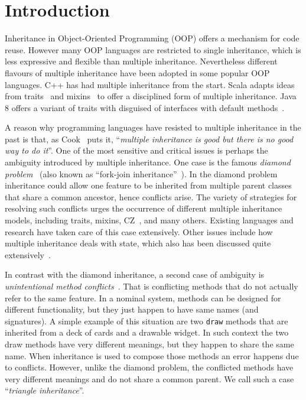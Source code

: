 \section{Introduction}
Inheritance in Object-Oriented Programming (OOP) offers a mechanism
for code reuse. However many OOP languages are restricted to single
inheritance, which is less expressive and flexible than multiple
inheritance. Nevertheless different flavours of multiple inheritance
have been adopted in some popular OOP languages. C++ has had 
multiple inheritance from the start. Scala adapts ideas from traits~\cite{scharli03traits} 
and mixins~\cite{bracha90mixin} to offer a disciplined form of multiple inheritance. Java 8 
offers a variant of traits with disguised of interfaces with default methods~\cite{goetz12fdefenders}.

A reason why programming languages have resisted to multiple
inheritance in the past is that, as Cook~\cite{Cook1987} puts it, 
``\emph{multiple inheritance is good but there is no good way to do it}''.
One of the most sensitive and critical issues is perhaps the ambiguity
introduced by multiple inheritance. One case is the famous
\textit{diamond problem}~\cite{Sak89dis,Singh1995} (also known as ``fork-join inheritance''~\cite{Sak89dis}). In the diamond problem inheritance could allow
one feature to be inherited from multiple parent classes that share a
common ancestor, hence
conflicts arise. The variety of strategies for resolving such conflicts
urges the occurrence of different multiple inheritance models,
including traits, mixins, CZ~\cite{malayeri2009cz}, and many others. Existing
languages and research have taken care of this case extensively. Other issues
include how multiple inheritance deals with state, 
which also has been discussed quite extensively~\cite{classless,malayeri2009cz,stroustrup1995}.

In contrast with the diamond inheritance, a second case of ambiguity
is \textit{unintentional method conflicts}~\cite{scharli03traits}. That is conflicting 
methods that do not actually refer to the same feature. 
In a nominal system, methods can be designed for different
functionality, but they just happen to have same names (and
signatures).
A simple example of this situation are two \lstinline{draw} methods that
are inherited from a deck of cards and a drawable widget. 
In such context the two draw methods have very different meanings, 
but they happen to share the same name.
When inheritance is used to compose those methods an
error happens due to conflicts. However, unlike the diamond problem,
the conflicted methods have very different meanings and do not share a
common parent. We call such a case ``\textit{triangle inheritance}''.

